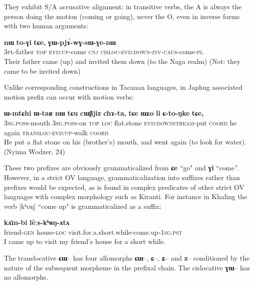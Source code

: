 \documentclass[oldfontcommands,twoside,a4paper,12pt]{article}
\newcommand{\ipa}[1]{{\phon\textbf{#1}}}
\newcommand{\gen}{\textsc{gen}}
\newcommand{\loc}{\textsc{loc}}
\newcommand{\poss}{\textsc{poss}}
\newcommand{\pst}{\textsc{pst}}
\newcommand{\sg}{\textsc{sg}}
\newcommand{\topic}{\textsc{top}}
\begin{document}
They exhibit S/A accusative alignment: in transitive verbs, the A is always the person doing the motion (coming or going), never the O, even in inverse forms with two human arguments:


\begin{exe}
\ex \label{ex:inverse}
\gll \ipa{nɯ-wa}   	\ipa{nɯ}   	\ipa{to-ɣi}   	\ipa{tɕe,}   	\ipa{ɣɯ-pjɤ́-wɣ-sɯ-ɣe-nɯ}    \\
3\textsc{pl}-father \textsc{top} \textsc{evd:up}-come \textsc{cnj} \textsc{cisloc}-\textsc{evd:down}-\textsc{inv}-\textsc{caus}-come-\textsc{pl} \\
\glt 	Their father came (up) and invited them down (to the Naga realm) (Not: they came to be invited down)
\end{exe}

Unlike corresponding constructions in Tacanan languages, in Japhug associated motion prefix can occur with motion verbs:

\begin{exe}
\ex \label{ex:inverse2}
\gll
\ipa{ɯ-mtɕhi}   	\ipa{ɯ-taʁ}   	\ipa{nɯ}   	\ipa{tɕu}   	\ipa{cɯβjiz}   	\ipa{chɤ-ta,}   	\ipa{tɕe}   	\ipa{ɯʑo}   	\ipa{li}   	\ipa{ɕ-to-ŋke}   	\ipa{tɕe,}    \\
3\sg{}.\poss{}-mouth 3\sg{}.\poss{}-on \topic{} \textsc{loc} flat.stone \textsc{evd:downstream}-put \textsc{coord}  he again \textsc{transloc}-\textsc{evd:up}-walk \textsc{coord} \\
\glt  He put a flat stone on his (brother's) mouth, and went again (to look for water). (Nyima Wodzer, 24)
\end{exe}

These two prefixes are obviously grammaticalized from \ipa{ɕe} ``go" and \ipa{ɣi} ``come''. However, in a strict OV language, grammaticalization into suffixes rather than prefixes would be expected, as is found in complex predicates of other strict OV languages with complex morphology such as Kiranti. For instance in Khaling the verb |kʰoŋ| ``come up" is grammaticalized as a suffix:

\begin{exe}
\ex \label{ex:khaling}
\gll \ipa{dʌrʌm-po} \ipa{kʌ̄m-bi} \ipa{lēːs-kʰɵŋ-ʌtʌ}      \\
 friend-\gen{} house-\loc{} visit.for.a.short.while-come.up-1\sg{}.\pst{} \\
\glt   I came up to visit my friend's house for a short while.
\end{exe}


The translocative \ipa{ɕɯ}-- has four allomorphs \ipa{ɕɯ}--, \ipa{ɕ}--, \ipa{ʑ}-- and \ipa{z}-- conditioned by the nature of the subsequent morpheme in the prefixal chain. The cislocative \ipa{ɣɯ}-- has no allomorphs.
\end{document}
